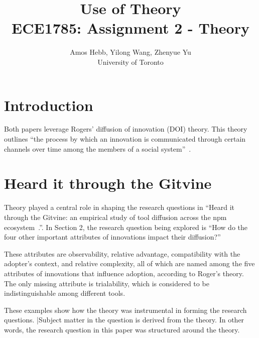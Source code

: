 \documentclass[journal,12pt,onecolumn,]{IEEEtran}
\begin{document}
\title{Use of Theory\\
{\normalsize ECE1785: Assignment 2 - Theory}}

\author{Amos Hebb, Yilong Wang, Zhenyue Yu\\ \small University of Toronto}

\maketitle






\section{Introduction}

Both papers leverage Rogers' diffusion of innovation (DOI) theory. This theory outlines ``the process by which an innovation is communicated through certain channels over time among the members of a social system''~\cite{rogers1995attributes}.

\section{Heard it through the {\sc Git}vine}

Theory played a central role in shaping the research questions in ``Heard it through the {\sc Git}vine: an empirical study of tool diffusion across the npm ecosystem~\cite{lamba2020heard}.''. In Section 2, the research question being explored is ``How do the four other important attributes of innovations impact their diffusion?''

These attributes are observability, relative advantage, compatibility with the adopter's context, and relative complexity, all of which are named among the five attributes of innovations that influence adoption, according to Roger's theory. The only missing attribute is trialability, which is considered to be indistinguishable among different tools.

These examples show how the theory was instrumental in forming the research questions. |Subject matter in the question is derived from the theory. In other words, the research question in this paper was structured around the theory.
\end{document}

